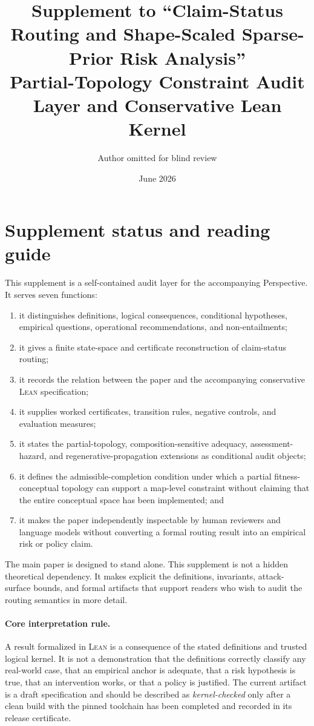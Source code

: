 \documentclass[10pt]{article}
\title{Supplement to ``Claim-Status Routing and Shape-Scaled Sparse-Prior Risk Analysis''\\
Partial-Topology Constraint Audit Layer and Conservative Lean Kernel}
\author{Author omitted for blind review}
\date{June 2026}
\newcommand{\Lean}{\textsc{Lean}}
\begin{document}
\maketitle
\tableofcontents
\newpage

\section{Supplement status and reading guide}
\label{sec:supp-status}

This supplement is a self-contained audit layer for the accompanying Perspective. It serves seven functions:
\begin{enumerate}[label=(\arabic*)]
\item it distinguishes definitions, logical consequences, conditional hypotheses, empirical questions, operational recommendations, and non-entailments;
\item it gives a finite state-space and certificate reconstruction of claim-status routing;
\item it records the relation between the paper and the accompanying conservative \Lean{} specification;
\item it supplies worked certificates, transition rules, negative controls, and evaluation measures;
\item it states the partial-topology, composition-sensitive adequacy, assessment-hazard, and regenerative-propagation extensions as conditional audit objects;
\item it defines the admissible-completion condition under which a partial fitness-conceptual topology can support a map-level constraint without claiming that the entire conceptual space has been implemented; and
\item it makes the paper independently inspectable by human reviewers and language models without converting a formal routing result into an empirical risk or policy claim.
\end{enumerate}

The main paper is designed to stand alone. This supplement is not a hidden theoretical dependency. It makes explicit the definitions, invariants, attack-surface bounds, and formal artifacts that support readers who wish to audit the routing semantics in more detail.

\paragraph{Core interpretation rule.} A result formalized in \Lean{} is a consequence of the stated definitions and trusted logical kernel. It is not a demonstration that the definitions correctly classify any real-world case, that an empirical anchor is adequate, that a risk hypothesis is true, that an intervention works, or that a policy is justified. The current artifact is a draft specification and should be described as \emph{kernel-checked} only after a clean build with the pinned toolchain has been completed and recorded in its release certificate.
\end{document}
